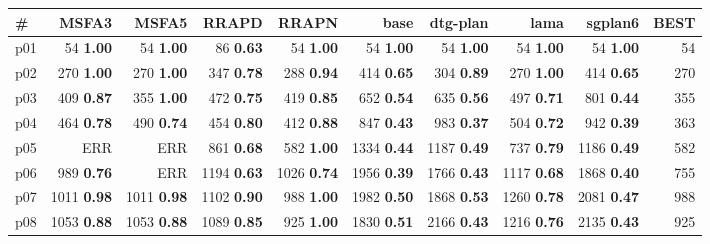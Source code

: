 \begin{tabular}{|l|rrrrrrrr|r|}
\hline
\textbf{\#} & \textbf{MSFA3} & \textbf{MSFA5} & \textbf{RRAPD} & \textbf{RRAPN} & \textbf{base} & \textbf{dtg-plan} & \textbf{lama} & \textbf{sgplan6} & \textbf{BEST}\\
\hline
p01 & {\footnotesize 54} \textbf{1.00} & {\footnotesize 54} \textbf{1.00} & {\footnotesize 86} \textbf{0.63} & {\footnotesize 54} \textbf{1.00} & {\footnotesize 54} \textbf{1.00} & {\footnotesize 54} \textbf{1.00} & {\footnotesize 54} \textbf{1.00} & {\footnotesize 54} \textbf{1.00} & 54\\
p02 & {\footnotesize 270} \textbf{1.00} & {\footnotesize 270} \textbf{1.00} & {\footnotesize 347} \textbf{0.78} & {\footnotesize 288} \textbf{0.94} & {\footnotesize 414} \textbf{0.65} & {\footnotesize 304} \textbf{0.89} & {\footnotesize 270} \textbf{1.00} & {\footnotesize 414} \textbf{0.65} & 270\\
p03 & {\footnotesize 409} \textbf{0.87} & {\footnotesize 355} \textbf{1.00} & {\footnotesize 472} \textbf{0.75} & {\footnotesize 419} \textbf{0.85} & {\footnotesize 652} \textbf{0.54} & {\footnotesize 635} \textbf{0.56} & {\footnotesize 497} \textbf{0.71} & {\footnotesize 801} \textbf{0.44} & 355\\
p04 & {\footnotesize 464} \textbf{0.78} & {\footnotesize 490} \textbf{0.74} & {\footnotesize 454} \textbf{0.80} & {\footnotesize 412} \textbf{0.88} & {\footnotesize 847} \textbf{0.43} & {\footnotesize 983} \textbf{0.37} & {\footnotesize 504} \textbf{0.72} & {\footnotesize 942} \textbf{0.39} & 363\\
p05 & ERR & ERR & {\footnotesize 861} \textbf{0.68} & {\footnotesize 582} \textbf{1.00} & {\footnotesize 1334} \textbf{0.44} & {\footnotesize 1187} \textbf{0.49} & {\footnotesize 737} \textbf{0.79} & {\footnotesize 1186} \textbf{0.49} & 582\\
p06 & {\footnotesize 989} \textbf{0.76} & ERR & {\footnotesize 1194} \textbf{0.63} & {\footnotesize 1026} \textbf{0.74} & {\footnotesize 1956} \textbf{0.39} & {\footnotesize 1766} \textbf{0.43} & {\footnotesize 1117} \textbf{0.68} & {\footnotesize 1868} \textbf{0.40} & 755\\
p07 & {\footnotesize 1011} \textbf{0.98} & {\footnotesize 1011} \textbf{0.98} & {\footnotesize 1102} \textbf{0.90} & {\footnotesize 988} \textbf{1.00} & {\footnotesize 1982} \textbf{0.50} & {\footnotesize 1868} \textbf{0.53} & {\footnotesize 1260} \textbf{0.78} & {\footnotesize 2081} \textbf{0.47} & 988\\
p08 & {\footnotesize 1053} \textbf{0.88} & {\footnotesize 1053} \textbf{0.88} & {\footnotesize 1089} \textbf{0.85} & {\footnotesize 925} \textbf{1.00} & {\footnotesize 1830} \textbf{0.51} & {\footnotesize 2166} \textbf{0.43} & {\footnotesize 1216} \textbf{0.76} & {\footnotesize 2135} \textbf{0.43} & 925\\

\end{tabular}
